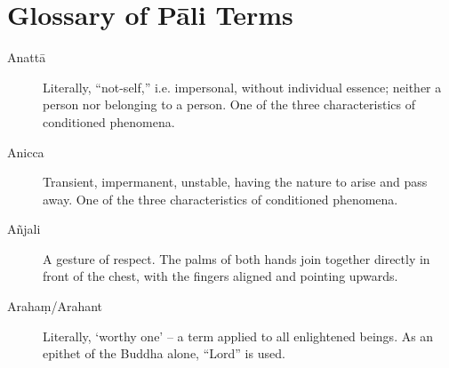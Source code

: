 \chapter{Glossary of Pāli Terms}

\begin{description}

  \item[Anattā] Literally, “not-self,” i.e. impersonal, without individual
    essence; neither a person nor belonging to a person. One of the three
    characteristics of conditioned phenomena.

  \item[Anicca] Transient, impermanent, unstable, having the nature to arise and
    pass away. One of the three characteristics of conditioned phenomena.

  \item[Añjali] A gesture of respect. The palms of both hands join together
    directly in front of the chest, with the fingers aligned and pointing upwards.

  \item[Arahaṃ/Arahant] Literally, ‘worthy one’ – a term applied to all
    enlightened beings. As an epithet of the Buddha alone, “Lord” is used.

\end{description}

